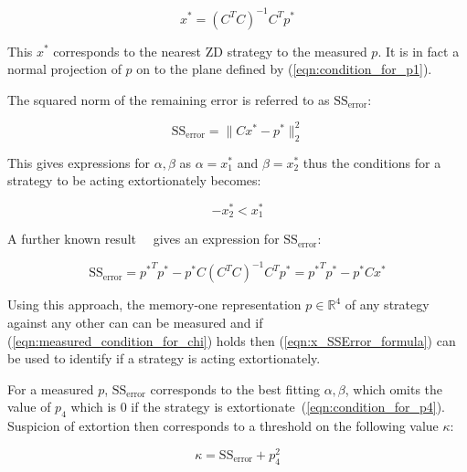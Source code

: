 \documentclass[a4paper]{article}
\begin{document}
\begin{equation}\label{eqn:x_star_formula}
    x^* = {\left(C^{T}C\right)}^{-1}C^{T}p^{*}
\end{equation}

This \(x^*\) corresponds to the nearest ZD strategy to the
measured \(p\). It is in fact a normal projection of \(p\) on to the plane
defined by (\ref{eqn:condition_for_p1}).

The squared norm of the remaining error is referred to as
\(\text{SS}_{\text{error}}\):

\begin{equation}\label{eqn:r_squared}
    \text{SS}_{\text{error}} = \|C x^*- p^*\|_2^2
\end{equation}

This gives expressions for \(\alpha, \beta\) as \(\alpha=x^*_1\) and
\(\beta=x^*_2\) thus the conditions for a strategy to be acting extortionately
becomes:

\begin{equation}
    -x^*_2 < x^*_1 \label{eqn:measured_condition_for_chi}
\end{equation}

A further known result~~\cite{kutner2004applied, rao1973linear,
wakefield2013bayesian} gives an expression for
\(\text{SS}_{\text{error}}\):

\begin{equation}\label{eqn:x_SSError_formula}
    \text{SS}_{\text{error}} = {p ^ *} ^ T p ^ * -
                               p ^ * C \left(C ^ T C \right) ^ {-1} C ^ T p ^ *
                             = {p ^ *} ^ T p ^ * - p ^ * C x ^ *
\end{equation}

Using this approach, the memory-one representation \(p\in\mathbb{R}^4\) of any
strategy against any other can can be measured and if
(\ref{eqn:measured_condition_for_chi}) holds then (\ref{eqn:x_SSError_formula})
can be used to identify if a strategy is acting extortionately.

For a measured \(p\), \(\text{SS}_{\text{error}}\) corresponds to the best
fitting \(\alpha, \beta\), which omits the value of \(p_4\) which is 0 if the
strategy is extortionate~(\ref{eqn:condition_for_p4}). Suspicion of
extortion then corresponds to a threshold on the following value \(\kappa\):

\begin{equation}\label{eqn:kappa_definition}
    \kappa = \text{SS}_{\text{error}} + p_4 ^ 2
\end{equation}
\end{document}

